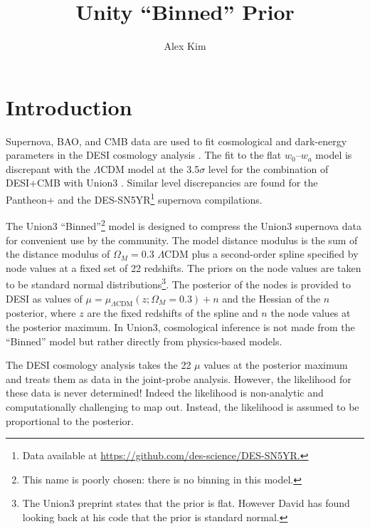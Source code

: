 \documentclass[11pt,a4paper]{article}
\title{Unity ``Binned'' Prior}
\author[a]{Alex Kim}
\affiliation[a]{Lawrence Berkeley National Laboratory}
\begin{document}
\maketitle

\section{Introduction}
Supernova, BAO, and CMB data are used to fit cosmological and dark-energy parameters in the DESI cosmology
analysis \cite{2024arXiv240403002D}.  The fit to the flat $w_0$--$w_a$ model is discrepant with the $\Lambda$CDM
model at the 3.5$\sigma$ level for the combination of DESI+CMB with Union3  \cite{2023arXiv231112098R}.
Similar level discrepancies are found for the Pantheon+ \cite{2022ApJ...938..113S} and the DES-SN5YR\footnote{Data available at \url{https://github.com/des-science/DES-SN5YR.}} supernova compilations.


The Union3 ``Binned''\footnote{This name is poorly chosen: there is no binning in this model.} model is designed to compress the Union3 supernova data for convenient use by the community.  
The  model distance modulus
is the sum of the distance modulus of $\Omega_M=0.3$  $\Lambda$CDM plus a second-order spline specified by node values
at a fixed set of 22 redshifts.  The priors on the node values are taken to be standard normal distributions\footnote{The Union3 preprint states that the prior is flat.  However David has found looking back at his code
that the prior is standard normal.}.  
The posterior of the nodes is provided to DESI as values of
$\mu = \mu_{\Lambda \text{CDM}}(z;\Omega_M=0.3) + n$ and the Hessian of the $n$ posterior,
where $z$ are the fixed redshifts of the spline and $n$ the node values at the posterior maximum.
In Union3, cosmological inference is not made from the ``Binned'' model but rather directly from physics-based models.

The DESI cosmology analysis takes the 22 $\mu$ values at the posterior maximum and treats them as data in the joint-probe analysis.  However, the likelihood for these data is never determined!
Indeed the likelihood is non-analytic and computationally challenging to map out.  Instead, the likelihood is assumed to be proportional
to the posterior.
\end{document}
